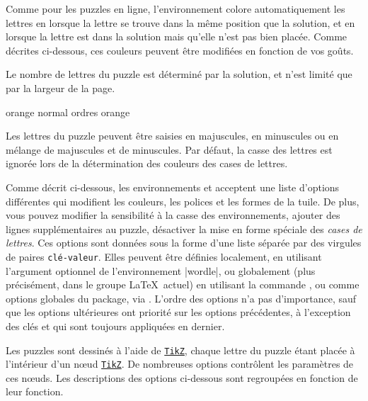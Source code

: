 \documentclass[svgnames]{report}
\newcommand\ctan[1]{\href{https://www.ctan.org/pkg/#1}{\texttt{#1}}}
\begin{document}
  Comme pour les puzzles en ligne, l'environnement 
  colore automatiquement les lettres en
  lorsque la lettre se trouve dans la même position que la solution, et en 
   lorsque la lettre est dans la solution mais qu'elle n'est pas bien placée. Comme
  décrites ci-dessous, ces couleurs peuvent être modifiées en fonction de vos goûts.

  Le nombre de lettres du puzzle est déterminé par la solution, et n'est limité que par la largeur de la page.

  \begin{example}
  \begin{wordle}[Lignes=4]{orange}
     normal
     ordres
     orange
  \end{wordle}
  \end{example}

  Les lettres du puzzle peuvent être saisies en majuscules, en minuscules ou en mélange de majuscules et de minuscules. Par défaut, la casse des lettres est ignorée lors de la détermination des couleurs des cases de lettres.
  
  Comme décrit ci-dessous, les environnements  et  acceptent une liste d'options différentes qui modifient les couleurs, les polices et les formes de la tuile. De plus, vous pouvez modifier la sensibilité à la casse des environnements, ajouter des lignes supplémentaires au puzzle, désactiver la mise en forme spéciale des \textit{cases de lettres}. Ces options sont données sous la forme d'une liste séparée par des virgules de paires \texttt{clé-valeur}. Elles peuvent être définies localement, en utilisant l'argument optionnel de l'environnement \keyword|wordle|, ou globalement (plus précisément, dans le groupe \LaTeX\ actuel) en utilisant la commande \keyword{\ParamsSutom} , ou comme options globales du package, via \keyword{\usepackage[options]{wordle}}. L'ordre des options n'a pas d'importance, sauf que les options ultérieures ont priorité sur les options précédentes, à l'exception des clés  et  qui sont toujours appliquées en dernier.
  
  Les puzzles  sont dessinés à l'aide de \ctan{TikZ}, chaque lettre du puzzle étant placée à l'intérieur d'un nœud \ctan{TikZ}. De nombreuses options contrôlent les paramètres de ces nœuds. Les descriptions des options ci-dessous sont regroupées en fonction de leur fonction.
  
\end{document}
